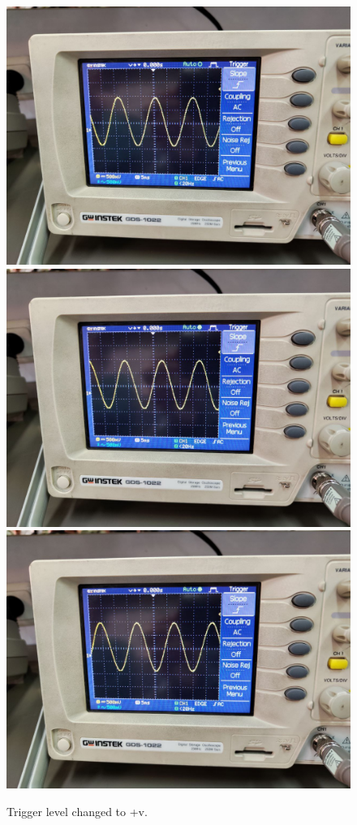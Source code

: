 \documentclass[11pt]{article}
\begin{document}
\begin{question}
{        \begin{figure}[H]
            \begin{center}
                \includegraphics[scale=0.1]{Fig/46.jpeg}
                \includegraphics[scale=0.1]{Fig/47.jpeg}
                \includegraphics[scale=0.1]{Fig/48.jpeg}
                \caption{Trigger level changed to +v.}
            \end{center}
        \end{figure}
        
}
\end{question}
\end{document}
